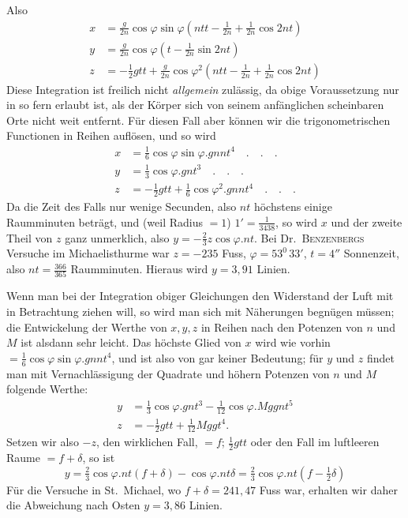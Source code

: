 Also
\[
\begin{aligned}
x&=\tfrac{g}{2n}\cos\varphi\sin\varphi(ntt-\tfrac{1}{2n}+\tfrac{1}{2n}\cos2nt)\\
y&=\tfrac{g}{2n}\cos\varphi(t-\tfrac{1}{2n}\sin2nt)\\
z&=-\tfrac12gtt+\tfrac{g}{2n}\cos\varphi^2(ntt-\tfrac{1}{2n}+\tfrac{1}{2n}\cos2nt)
\end{aligned}
\]
Diese Integration ist freilich nicht \textit{allgemein} zulässig, da obige Voraussetzung nur in so fern erlaubt ist, als der Körper sich von seinem anfänglichen scheinbaren Orte nicht weit entfernt. Für diesen Fall aber können wir die trigonometrischen Functionen in Reihen auflösen, und so wird
\[
\begin{aligned}
x&=\tfrac16\cos\varphi\sin\varphi.gnnt^4\quad.\quad.\quad.\\
y&=\tfrac13\cos\varphi.gnt^3\quad.\quad.\quad.\\
z&=-\tfrac12gtt+\tfrac16\cos\varphi^2.gnnt^4\quad.\quad.\quad.
\end{aligned}
\]
Da die Zeit des Falls nur wenige Secunden, also $nt$ höchstens einige Raumminuten beträgt, und (weil Radius $=1$) $1'=\tfrac{1}{3438}$, so wird $x$ und der zweite Theil von $z$ ganz unmerklich, also $y=-\tfrac23z\cos\varphi.nt$. Bei Dr.\ \textsc{Benzenbergs} Versuche im Michaelisthurme war $z=-235$ Fuss, $\varphi=53^0\,33'$, $t=4''$ Sonnenzeit, also $nt=\tfrac{366}{365}$ Raumminuten. Hieraus wird $y=3{,}91$ Linien.

Wenn man bei der Integration obiger Gleichungen den Widerstand der Luft mit in Betrachtung ziehen will, so wird man sich mit Näherungen begnügen müssen; die Entwickelung der Werthe von $x,y,z$ in Reihen nach den Potenzen von $n$ und $M$ ist alsdann sehr leicht. Das höchste Glied von $x$ wird wie vorhin $=\tfrac16\cos\varphi\sin\varphi.gnnt^4$, und ist also von gar keiner Bedeutung; für $y$ und $z$ findet man mit Vernachlässigung der Quadrate und höhern Potenzen von $n$ und $M$ folgende Werthe:
\[
\begin{aligned}
y&=\tfrac13\cos\varphi.gnt^3-\tfrac{1}{12}\cos\varphi.Mggnt^5\\
z&=-\tfrac12gtt+\tfrac{1}{12}Mggt^4.
\end{aligned}
\]
Setzen wir also $-z$, den wirklichen Fall, $=f$; $\tfrac12gtt$ oder den Fall im luftleeren Raume $=f+\delta$, so ist
\[
y=\tfrac23\cos\varphi.nt(f+\delta)-\cos\varphi.nt\delta=\tfrac23\cos\varphi.nt(f-\tfrac12\delta)
\]
Für die Versuche in St.\ Michael, wo $f+\delta=241{,}47$ Fuss war, erhalten wir daher die Abweichung nach Osten $y=3{,}86$ Linien.

